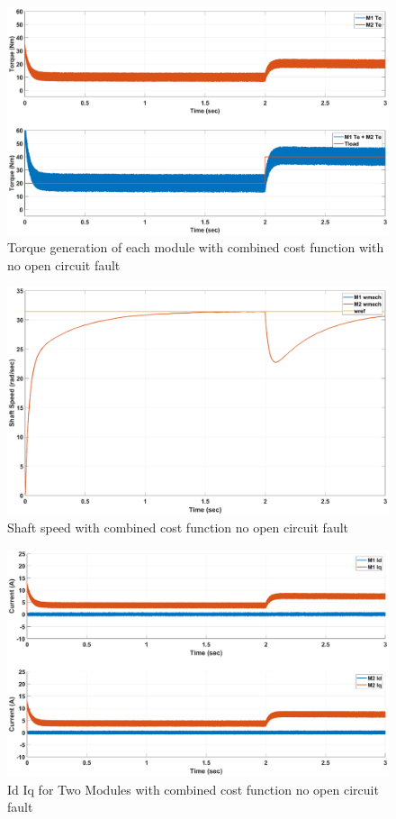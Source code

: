 \documentclass{article}
\begin{document}
\begin{figure}[H]
\centering
\includegraphics[scale=0.3]{Figures/TwoModule/CombinedCost/Torques.eps}
\caption{Torque generation of each module with combined cost function with no open circuit fault}
\label{fig:Tload_TwoModuleCombinedCost}
\end{figure}
\begin{figure}[H]
\centering
\includegraphics[scale=0.3]{Figures/TwoModule/CombinedCost/ShaftSpeed.eps}
\caption{Shaft speed with combined cost function no open circuit fault}
\label{fig:Wshaft_TwoModuleCombinedCost}
\end{figure}
\begin{figure}[H]
\centering
\includegraphics[scale=0.3]{Figures/TwoModule/CombinedCost/Id_Iq.eps}
\caption{Id Iq for Two Modules with combined cost function no open circuit fault}
\label{fig:Current_dq_TwoModuleCombinedCost}
\end{figure}
\end{document}
